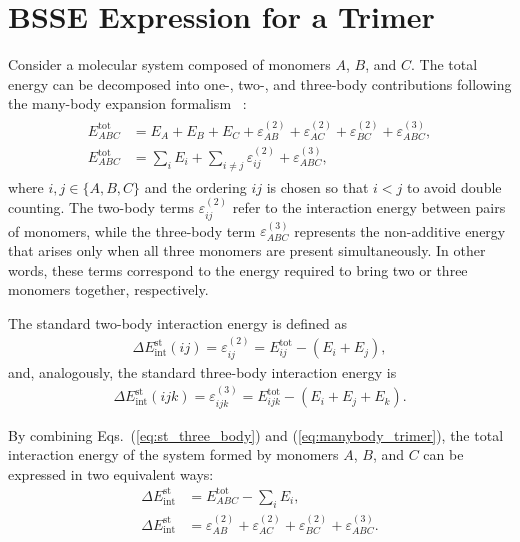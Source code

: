 \section{BSSE Expression for a Trimer}
\label{sec:expr}

Consider a molecular system composed of monomers \(A\), \(B\), and \(C\).
The total energy can be decomposed into one-, two-, and three-body contributions
following the many-body expansion formalism~\autocite{Valiron1997} :
\begin{align}
  \begin{split}
  E^{\mathrm{tot}}_{ABC} &=
  E_A + E_B + E_C 
  +   \varepsilon^{(2)}_{AB}
  +   \varepsilon^{(2)}_{AC}
  +   \varepsilon^{(2)}_{BC}
  +   \varepsilon^{(3)}_{ABC},\\[0.25cm]
  E^{\mathrm{tot}}_{ABC} &=
  \sum_{i}E_i + \sum_{i\neq j}\varepsilon_{ij}^{(2)} + \varepsilon^{(3)}_{ABC},
  \label{eq:manybody_trimer}
  \end{split}
\end{align}
where \(i,j\in\{A,B,C\}\) and the ordering \(ij\) is chosen so that \(i<j\)
to avoid double counting.
The two-body terms \(\varepsilon_{ij}^{(2)}\) refer to the interaction energy
between pairs of monomers, while the three-body term
\(\varepsilon_{ABC}^{(3)}\) represents the non-additive energy
that arises only when all three monomers are present simultaneously.
In other words, these terms correspond to the energy required to bring
two or three monomers together, respectively.

\noindent
The standard two-body interaction energy is defined as
\begin{align}
    \Delta E_{\mathrm{int}}^{\mathrm{st}}(ij)
    = \varepsilon_{ij}^{(2)}
    = E_{ij}^{\mathrm{tot}} - (E_i + E_j),
    \label{eq:equation_2}
\end{align}
and, analogously, the standard three-body interaction energy is
\begin{align}
    \Delta E_{\mathrm{int}}^{\mathrm{st}}(ijk)
    = \varepsilon_{ijk}^{(3)}
    = E_{ijk}^{\mathrm{tot}} - (E_i + E_j + E_k).
    \label{eq:st_three_body}
\end{align}

\noindent
By combining Eqs.~(\ref{eq:st_three_body}) and (\ref{eq:manybody_trimer}),
the total interaction energy of the system formed by monomers \(A\), \(B\), and \(C\)
can be expressed in two equivalent ways:
\begin{align}
      \Delta E_{\mathrm{int}}^{\mathrm{st}}
      &= E^{\mathrm{tot}}_{ABC} - \sum_{i}E_i,
      \label{eq:three_body_inter_1}\\[0.25cm]
      \Delta E_{\mathrm{int}}^{\mathrm{st}}
      &= 
          \varepsilon^{(2)}_{AB}
      +   \varepsilon^{(2)}_{AC}
      +   \varepsilon^{(2)}_{BC}
      +   \varepsilon^{(3)}_{ABC}.
      \label{eq:three_body_inte_2}
\end{align}

